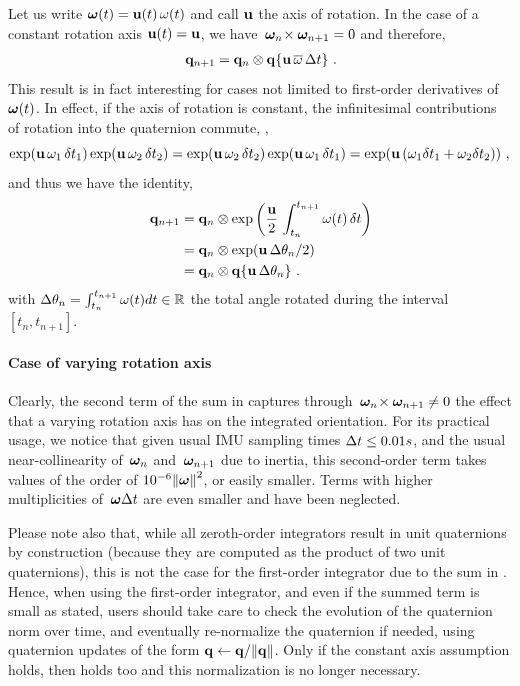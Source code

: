 Let us write ${\bm \omega}(t)={\bf u}(t)\,\omega(t)$ and call ${\bf u}$ the axis of rotation.
In the case of a constant rotation axis ${\bf u}(t) = {\bf u}$, we have $\,{\bm \omega}_n\!\times\!\,{\bm \omega}_{n+1}=0$ and therefore,
%
\begin{align}\label{equ:first_order_constant_axis}
\,{\bf q}_{n+1} = {\bf q}_n\otimes{\bf q}\{{\bf u}\,\overline\omega\,\Delta t\}~.
\end{align}
%
This result is in fact interesting for cases not limited to first-order derivatives of ${\bm \omega}(t)$. 
In effect, if the axis of rotation is constant, the infinitesimal contributions of rotation into the quaternion commute, \ie, 
%
$$\exp ({\bf u}\,\omega_1\,\delta t_1)\exp ({\bf u}\,\omega_2\,\delta t_2)=\exp ({\bf u}\,\omega_2\,\delta t_2)\exp ({\bf u}\,\omega_1\,\delta t_1)=\exp ({\bf u}\,(\omega_1\delta t_1 + \omega_2\delta t_2))~,$$ 
%
and thus we have the identity,
%
\begin{subequations}
\begin{align}
\,{\bf q}_{n+1} 
  &= {\bf q}_n\otimes \exp\left(\frac{{\bf u}}2\,\int_{t_n}^{t_{n+1}}\omega(t)\,\delta t\right) \\
  &= {\bf q}_n\otimes \exp({\bf u}\,\Delta\theta_n/2) \\
  &= {\bf q}_n\otimes {\bf q}\{{\bf u}\,\Delta\theta_n\}~.
\end{align}
\end{subequations}
%
with $\Delta\theta_n = \int_{t_n}^{t_{n+1}} \omega(t)dt \in {\mathbb R}$ the total angle rotated  during the interval $[t_n,t_{n+1}]$.


\paragraph{Case of varying rotation axis}

Clearly, the second term of the sum in  captures through $\,{\bm \omega}_n\!\times\!\,{\bm \omega}_{n+1}\neq0$ the effect that a varying rotation axis has on the integrated orientation.
For its practical usage, we notice that given usual IMU sampling times $\Delta t\le0.01s$, and the usual near-collinearity of $\,{\bm \omega}_n$ and $\,{\bm \omega}_{n+1}$ due to inertia, this second-order term takes values of the order of $10^{-6}{\left\|{\bm \omega}\right\|}^2$, or easily smaller. 
Terms with higher multiplicities of $\,{\bm \omega}\Delta t$ are even smaller and have been neglected. 


Please note also that, while all zeroth-order integrators result in unit quaternions by construction (because they are computed as the product of two unit quaternions), this is not the case for the first-order integrator due to the sum in . Hence, when using the first-order integrator, and even if the summed term is small as stated, users should take care to check the evolution of the quaternion norm over time, and eventually re-normalize the quaternion if needed, using quaternion updates of the form ${\bf q}\gets{\bf q}/{\left\|{\bf q}\right\|}$. Only if the constant axis assumption holds, then  holds too and this normalization is no longer necessary. 



